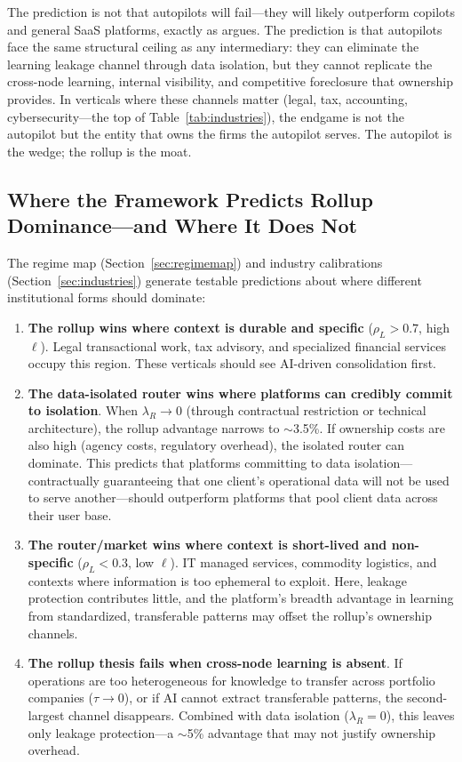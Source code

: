 \documentclass[12pt]{article}
\theoremstyle{definition}
\begin{document}
The prediction is not that autopilots will fail---they will likely outperform copilots and general SaaS platforms, exactly as \citet{sequoia2025services} argues. The prediction is that autopilots face the same structural ceiling as any intermediary: they can eliminate the learning leakage channel through data isolation, but they cannot replicate the cross-node learning, internal visibility, and competitive foreclosure that ownership provides. In verticals where these channels matter (legal, tax, accounting, cybersecurity---the top of Table~\ref{tab:industries}), the endgame is not the autopilot but the entity that owns the firms the autopilot serves. The autopilot is the wedge; the rollup is the moat.

\subsection{Where the Framework Predicts Rollup Dominance---and Where It Does Not}

The regime map (Section~\ref{sec:regimemap}) and industry calibrations (Section~\ref{sec:industries}) generate testable predictions about where different institutional forms should dominate:

\begin{enumerate}[leftmargin=*]
\item \textbf{The rollup wins where context is durable and specific} ($\rho_L > 0.7$, high $\ell$). Legal transactional work, tax advisory, and specialized financial services occupy this region. These verticals should see AI-driven consolidation first.

\item \textbf{The data-isolated router wins where platforms can credibly commit to isolation}. When $\lambda_R \to 0$ (through contractual restriction or technical architecture), the rollup advantage narrows to $\sim$3.5\%. If ownership costs are also high (agency costs, regulatory overhead), the isolated router can dominate. This predicts that platforms committing to data isolation---contractually guaranteeing that one client's operational data will not be used to serve another---should outperform platforms that pool client data across their user base.

\item \textbf{The router/market wins where context is short-lived and non-specific} ($\rho_L < 0.3$, low $\ell$). IT managed services, commodity logistics, and contexts where information is too ephemeral to exploit. Here, leakage protection contributes little, and the platform's breadth advantage in learning from standardized, transferable patterns may offset the rollup's ownership channels.

\item \textbf{The rollup thesis fails when cross-node learning is absent}. If operations are too heterogeneous for knowledge to transfer across portfolio companies ($\tau \to 0$), or if AI cannot extract transferable patterns, the second-largest channel disappears. Combined with data isolation ($\lambda_R = 0$), this leaves only leakage protection---a $\sim$5\% advantage that may not justify ownership overhead.
\end{enumerate}
\end{document}
